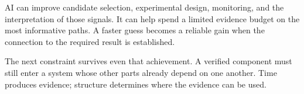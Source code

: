 AI can improve candidate selection, experimental design, monitoring, and the interpretation of those signals. It can help spend a limited evidence budget on the most informative paths. A faster guess becomes a reliable gain when the connection to the required result is established.

The next constraint survives even that achievement. A verified component must still enter a system whose other parts already depend on one another. Time produces evidence; structure determines where the evidence can be used.

